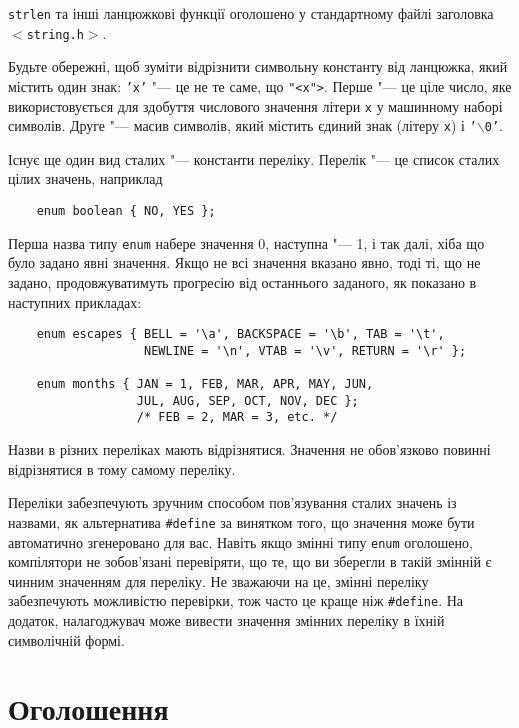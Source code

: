 \documentclass[a4paper,12pt]{book}
\begin{document}
  \texttt{strlen} та інші ланцюжкові функції оголошено у стандартному файлі заголовка
  \texttt{\mbox{$<$}string.h\mbox{$>$}}.

  Будьте обережні, щоб зуміти відрізнити символьну константу від ланцюжка, який містить
  один знак: \texttt{'x'} "--- це не те саме, що \texttt{"<x">}. Перше
  "--- це ціле число, яке використовується для здобуття числового значення літери
  \texttt{x} у машинному наборі символів. Друге "--- масив символів, який містить
  єдиний знак (літеру \texttt{x}) і \texttt{'\mbox{$\backslash$}0'}.

  Існує ще один вид сталих "--- константи переліку. Перелік "--- це список сталих
  цілих значень, наприклад
  \begin{verbatim}
    enum boolean { NO, YES };
  \end{verbatim}

  Перша назва типу \texttt{enum} набере значення 0, наступна "--- 1, і так далі, хіба
  що було задано явні значення. Якщо не всі значення вказано явно, тоді ті, що не задано,
  продовжуватимуть прогресію від останнього заданого, як показано в наступних прикладах:
  \begin{verbatim}
    enum escapes { BELL = '\a', BACKSPACE = '\b', TAB = '\t',
                   NEWLINE = '\n', VTAB = '\v', RETURN = '\r' };

    enum months { JAN = 1, FEB, MAR, APR, MAY, JUN,
                  JUL, AUG, SEP, OCT, NOV, DEC };
                  /* FEB = 2, MAR = 3, etc. */
  \end{verbatim}

  Назви в різних переліках мають відрізнятися. Значення не обов'язково повинні
  відрізнятися в тому самому переліку.

  Переліки забезпечують зручним способом пов'язування сталих значень із назвами, як альтернатива
  \texttt{\#define} за винятком того, що значення може бути автоматично згенеровано для вас.
  Навіть якщо змінні типу \texttt{enum} оголошено, компілятори не зобов'язані перевіряти, що те, що
  ви зберегли в такій змінній є чинним значенням для переліку. Не зважаючи на це, змінні
  переліку забезпечують можливістю перевірки, тож часто це краще ніж \texttt{\#define}. На
  додаток, налагоджувач може вивести значення змінних переліку в їхній символічній формі.

\section{Оголошення}
\end{document}
